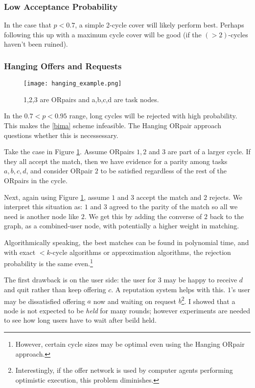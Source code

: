 \documentclass[main.tex]{subfiles}
\begin{document}
\subsubsection{Low Acceptance Probability}
In the case that $p < 0.7$, a simple 2-cycle cover will likely perform best. Perhaps following this up with a maximum cycle cover will be good (if the $(>2)$-cycles haven't been ruined).

\subsubsection{Hanging Offers and Requests}
\begin{figure}
  \texttt{[image: hanging\_example.png]}
  \caption{1,2,3 are ORpairs and a,b,c,d are task nodes.}
  \label{hanging_example}
\end{figure}

In the $0.7 < p < 0.95$ range, long cycles will be rejected with high probability. This makes the \ref{bima} scheme infeasible. The Hanging ORpair approach questions whether this is necessessary.

Take the case in Figure \ref{hanging_example}. Assume ORpairs $1,2$ and $3$ are part of a larger cycle. If they all accept the match, then we have evidence for a parity among tasks $a,b,c,d$, and consider ORpair $2$ to be satisfied regardless of the rest of the ORpairs in the cycle.

Next, again using Figure \ref{hanging_example}, assume $1$ and $3$ accept the match and $2$ rejects. We interpret this situation as: $1$ and $3$ agreed to the parity of the match so all we need is another node like $2$. We get this by adding the converse of $2$ back to the graph, as a combined-user node, with potentially a higher weight in matching.

Algorithmically speaking, the best matches can be found in polynomial time, and with exact $<k$-cycle algorithms or approximation algorithms, the rejection probability is the same even.\footnote{However, certain cycle sizes may be optimal even using the Hanging ORpair approach.}

The first drawback is on the user side: the user for $3$ may be happy to receive $d$ and quit rather than keep offering $c$. A reputation system helps with this. $1$'s user may be dissatisfied offering $a$ now and waiting on request $b$\footnote{Interestingly, if the offer network is used by computer agents performing optimistic execution, this problem diminishes.}. I showed that a node is not expected to be \textit{held} for many rounds; however experiments are needed to see how long users have to wait after beild held.
\end{document}

